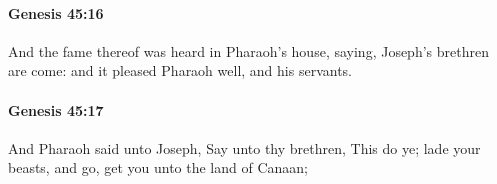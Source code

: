 		\paragraph{Genesis 45:16} %
			\label{GENESIS-45-16}

			And the fame thereof was heard in Pharaoh's house, saying, Joseph's brethren are come: and it pleased Pharaoh well, and his servants.


		\paragraph{Genesis 45:17} %
			\label{GENESIS-45-17}

			And Pharaoh said unto Joseph, Say unto thy brethren, This do ye; lade your beasts, and go, get you unto the land of Canaan;


